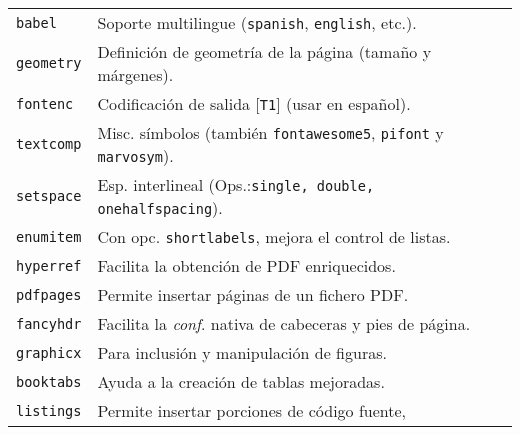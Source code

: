 \documentclass[10pt,landscape,a4paper]{article}
\begin{document}
\begin{multicols}{3}
\begin{tabular}{@{}p{\the\MyLen}%
                @{}p{\linewidth-\the\MyLen}@{}}
\texttt{babel}		& Soporte multilingue (\texttt{spanish}, \texttt{english}, etc.).\\
\texttt{geometry}	& Definición de geometría de la página (tamaño y márgenes).\\
\texttt{fontenc}	& Codificación de salida [\texttt{T1}] (usar en español).\\
\texttt{textcomp}	& Misc. símbolos (también \texttt{fontawesome5}, \texttt{pifont} y \texttt{marvosym}). \\
\texttt{setspace}	& Esp. interlineal (Ops.:\texttt{{single}, \texttt{double}, \texttt{onehalf}}\texttt{spacing}). \\
\texttt{enumitem}    & Con opc. \texttt{shortlabels}, mejora el control de listas.\\
\texttt{hyperref}	& Facilita la obtención de PDF enriquecidos.\\
\texttt{pdfpages}	& Permite insertar páginas de un fichero PDF.\\
\texttt{fancyhdr}	& Facilita la \emph{conf}. nativa de cabeceras y pies de página.\\
\texttt{graphicx}	& Para inclusión y manipulación de figuras.\\
\texttt{booktabs}	& Ayuda a la creación de tablas mejoradas.\\
\texttt{listings}	& Permite insertar porciones de código fuente,\\
\end{tabular}




\end{multicols}
\end{document}
